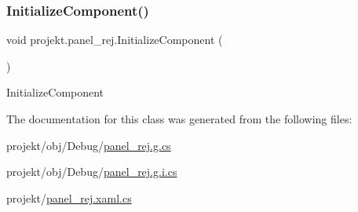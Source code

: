 \subsubsection{\texorpdfstring{Initialize\+Component()}{InitializeComponent()}\hspace{0.1cm}{\footnotesize\ttfamily [9/9]}}
{\footnotesize\ttfamily void projekt.\+panel\+\_\+rej.\+Initialize\+Component (\begin{DoxyParamCaption}{ }\end{DoxyParamCaption})\hspace{0.3cm}{\ttfamily [inline]}}



Initialize\+Component 



The documentation for this class was generated from the following files\+:\begin{DoxyCompactItemize}
\item 
projekt/obj/\+Debug/\mbox{\hyperlink{_debug_2panel__rej_8g_8cs}{panel\+\_\+rej.\+g.\+cs}}\item 
projekt/obj/\+Debug/\mbox{\hyperlink{_debug_2panel__rej_8g_8i_8cs}{panel\+\_\+rej.\+g.\+i.\+cs}}\item 
projekt/\mbox{\hyperlink{panel__rej_8xaml_8cs}{panel\+\_\+rej.\+xaml.\+cs}}\end{DoxyCompactItemize}
